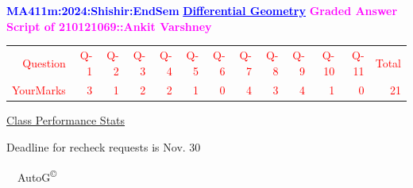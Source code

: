 \documentclass{article}                              %
\begin{document}
%
\vspace*{1in}

\begin{center}
	\textbf{\textcolor{blue}{\LARGE MA411m:2024:Shishir:EndSem}}
	\vskip 1cm
	\textbf{\textcolor{blue}{\underline{\Large Differential Geometry}}}
	\vskip 1cm
	\textbf{\textcolor{magenta}{\LARGE Graded Answer Script of 210121069::Ankit Varshney}}
\end{center}


\begin{center}
	\Huge 
	\textcolor{red}{
	\begin{tabular}{*{13}{r}}
		Question&Q-1& Q-2& Q-3& Q-4& Q-5& Q-6& Q-7& Q-8& Q-9& Q-10& Q-11&Total  \\
        	YourMarks&3&1&2&2&1&0&4&3&4&1&0&21
	\end{tabular}
	}
        \vskip 2cm
	\large
	\underline{Class Performance Stats}
	\DTLsetseparator{;}
	\begin{table}[htbp]
		\centering
	\end{table}
	\vskip 1cm
	Deadline for recheck requests is Nov. 30
\end{center}
\ \vfill \ \hfill \small AutoG\textsuperscript{\copyright}
\newpage
%
\end{document}
